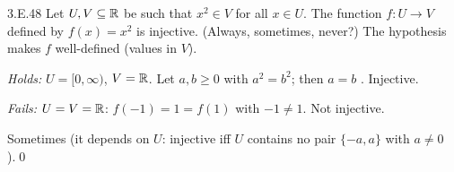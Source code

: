 \begin{bookex}[essential]{3.E.48}
Let $U,V\subseteq\mathbb{R}$ be such that $x^2\in V$ for all $x\in U$. The function $f:U\to V$ defined by $f(x)=x^2$ is injective. (Always, sometimes, never?)
\solution
\given The hypothesis makes $f$ well-defined (values in $V$).
\begin{steps}
\item \emph{Holds:} $U=[0,\infty)$, $V=\mathbb{R}$. Let $a,b\ge0$ with $a^2=b^2$; then $a=b$ . Injective.
\item \emph{Fails:} $U=V=\mathbb{R}$: $f(-1)=1=f(1)$ with $-1\ne1$. Not injective.
\end{steps}
\conclusion Sometimes (it depends on $U$: injective iff $U$ contains no pair $\{-a,a\}$ with $a\ne0$).\qed
\end{bookex}
